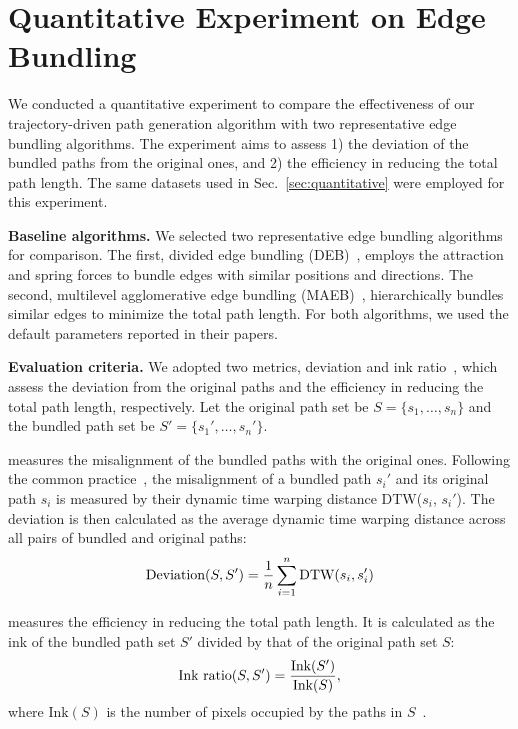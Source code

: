 





\section{Quantitative Experiment on Edge Bundling}
\label{sec:appendixA}




We conducted a quantitative experiment to compare the effectiveness of our trajectory-driven path generation algorithm with two representative edge bundling algorithms.
The experiment aims to assess 1) the deviation of the bundled paths from the original ones, and 2) the efficiency in reducing the total path length. 
The same datasets used in Sec.~\ref{sec:quantitative} were employed for this experiment.


\noindent\textbf{Baseline algorithms.} We selected two representative edge bundling algorithms for comparison.
The first, divided edge bundling (DEB)~\cite{selassie2011divided}, employs the attraction and spring forces to bundle edges with similar positions and directions.
The second, multilevel agglomerative edge bundling (MAEB)~\cite{gansner2011MINGLE}, hierarchically bundles similar edges to minimize the total path length.
For both algorithms, we used the default parameters reported in their papers.

\noindent\textbf{Evaluation criteria.}
We adopted two metrics, deviation and ink ratio~\cite{wallinger2022edgepath}, which assess the deviation from the original paths and the efficiency in reducing the total path length, respectively. 
Let the original path set be $S=\{s_1,\dots, s_n\}$ and the bundled path set be $S'=\{s_1',\dots, s_n'\}$.


 measures the misalignment of the bundled paths with the original ones.
Following the common practice~\cite{Francois2011globaldtw,Tao2021comparative}, the misalignment of a bundled path $s_i'$ and its original path $s_i$ is measured by their dynamic time warping distance DTW($s_i$, $s_i'$).
The deviation is then calculated as the average dynamic time warping distance across all pairs of bundled and original paths:
\begin{equation}
\text{Deviation}(S,S') = \frac{1}{n}\sum^n_{i=1}\text{DTW}(s_i,s_i')
\notag
\end{equation}

 measures the efficiency in reducing the total path length.
It is calculated as the ink of the bundled path set $S'$ divided by that of the original path set $S$:
\begin{equation}
\text{Ink ratio}(S,S') = \frac{\text{Ink}(S')}{\text{Ink}(S)},
\notag
\end{equation}
where $\text{Ink}(S)$ is the number of pixels occupied by the paths in $S$~\cite{wallinger2022edgepath}.


